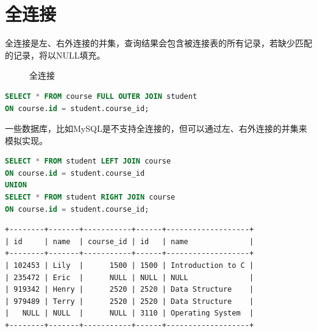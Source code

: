 \documentclass[12pt, openany, oneside]{book}
\begin{document}
\section{全连接}

全连接是左、右外连接的并集，查询结果会包含被连接表的所有记录，若缺少匹配的记录，将以NULL填充。

\begin{figure}[H]
	\centering
	\caption{全连接}
\end{figure}


\begin{lstlisting}[language=SQL]
SELECT * FROM course FULL OUTER JOIN student
ON course.id = student.course_id;
\end{lstlisting}

一些数据库，比如MySQL是不支持全连接的，但可以通过左、右外连接的并集来模拟实现。\\


\begin{lstlisting}[language=SQL]
SELECT * FROM student LEFT JOIN course
ON course.id = student.course_id
UNION
SELECT * FROM student RIGHT JOIN course
ON course.id = student.course_id;
\end{lstlisting}

\begin{tcolorbox}
	\begin{verbatim}
+--------+-------+-----------+------+-------------------+
| id     | name  | course_id | id   | name              |
+--------+-------+-----------+------+-------------------+
| 102453 | Lily  |      1500 | 1500 | Introduction to C |
| 235472 | Eric  |      NULL | NULL | NULL              |
| 919342 | Henry |      2520 | 2520 | Data Structure    |
| 979489 | Terry |      2520 | 2520 | Data Structure    |
|   NULL | NULL  |      NULL | 3110 | Operating System  |
+--------+-------+-----------+------+-------------------+
	\end{verbatim}
\end{tcolorbox}
\end{document}
